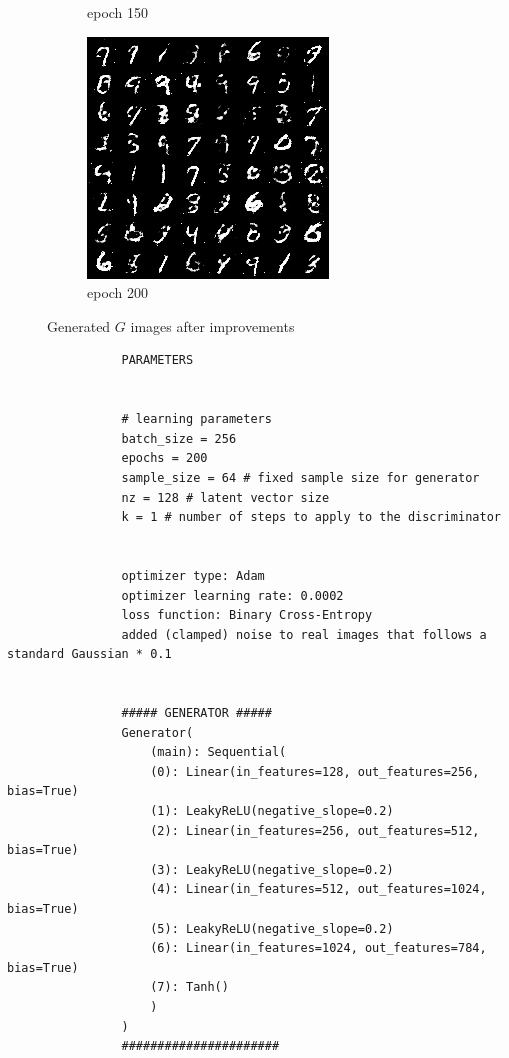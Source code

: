\documentclass[a4paper]{article}
\theoremstyle{definition}
\newenvironment{soln}{
	\leavevmode\color{blue}\ignorespaces
}{}
\begin{document}
\begin{enumerate} [label=(\alph*)]
\begin{soln}
\begin{figure}[H]
\begin{subfigure}[b]{0.3\textwidth}
					\caption{epoch 150}
				\end{subfigure}
				\hfill
				\begin{subfigure}[b]{0.3\textwidth}
					\centering
					\includegraphics[width=\textwidth]{1c_e200.png}
					\caption{epoch 200}
				\end{subfigure}
				\caption{Generated $G$ images after improvements}
				\label{fig:three graphs}
			\end{figure}
			
			\begin{verbatim}
				PARAMETERS
				
				
				# learning parameters
				batch_size = 256
				epochs = 200
				sample_size = 64 # fixed sample size for generator
				nz = 128 # latent vector size
				k = 1 # number of steps to apply to the discriminator
				
				
				optimizer type: Adam
				optimizer learning rate: 0.0002
				loss function: Binary Cross-Entropy
				added (clamped) noise to real images that follows a standard Gaussian * 0.1
				
				
				##### GENERATOR #####
				Generator(
					(main): Sequential(
					(0): Linear(in_features=128, out_features=256, bias=True)
					(1): LeakyReLU(negative_slope=0.2)
					(2): Linear(in_features=256, out_features=512, bias=True)
					(3): LeakyReLU(negative_slope=0.2)
					(4): Linear(in_features=512, out_features=1024, bias=True)
					(5): LeakyReLU(negative_slope=0.2)
					(6): Linear(in_features=1024, out_features=784, bias=True)
					(7): Tanh()
					)
				)
				######################
				

\end{verbatim}
\end{soln}
\end{enumerate}
\end{document}
